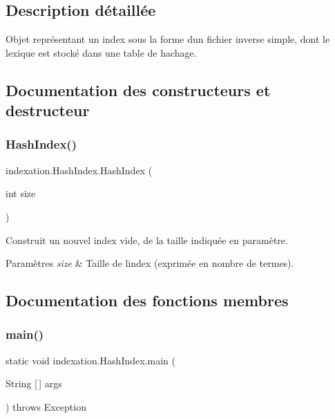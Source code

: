 \subsection{Description détaillée}
Objet représentant un index sous la forme d\textquotesingle{}un fichier inverse simple, dont le lexique est stocké dans une table de hachage. 

\subsection{Documentation des constructeurs et destructeur}
\mbox{\label{classindexation_1_1HashIndex_ac1dd959e3bd9e910f7c98cccc7782993}} 
\subsubsection{\texorpdfstring{Hash\+Index()}{HashIndex()}}
{\footnotesize\ttfamily indexation.\+Hash\+Index.\+Hash\+Index (\begin{DoxyParamCaption}\item[{int}]{size }\end{DoxyParamCaption})}

Construit un nouvel index vide, de la taille indiquée en paramètre.


\begin{DoxyParams}{Paramètres}
{\em size} & Taille de l\textquotesingle{}index (exprimée en nombre de termes). \\
\hline
\end{DoxyParams}


\subsection{Documentation des fonctions membres}
\mbox{\label{classindexation_1_1HashIndex_aaaa8220dffaf3d4a5a77e0bccfd2fccd}} 
\subsubsection{\texorpdfstring{main()}{main()}}
{\footnotesize\ttfamily static void indexation.\+Hash\+Index.\+main (\begin{DoxyParamCaption}\item[{String \mbox{[}$\,$\mbox{]}}]{args }\end{DoxyParamCaption}) throws Exception\hspace{0.3cm}{\ttfamily [static]}}

